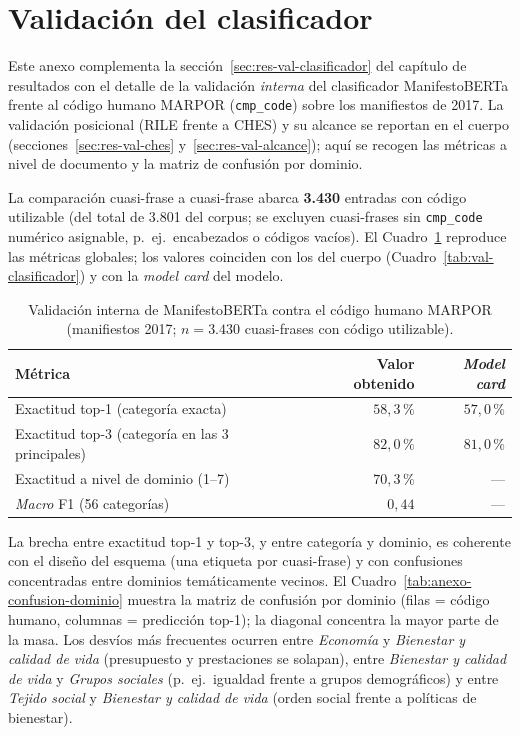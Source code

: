 \section{Validación del clasificador}
\label{anexo:validacion}

Este anexo complementa la sección~\ref{sec:res-val-clasificador} del capítulo de
resultados con el detalle de la validación \emph{interna} del clasificador
ManifestoBERTa \cite{manifestoberta2024} frente al código humano MARPOR
(\texttt{cmp\_code}) sobre los manifiestos de 2017. La validación posicional
(RILE frente a CHES) y su alcance se reportan en el cuerpo
(secciones~\ref{sec:res-val-ches} y~\ref{sec:res-val-alcance}); aquí se recogen
las métricas a nivel de documento y la matriz de confusión por dominio.

La comparación cuasi-frase a cuasi-frase abarca \textbf{3.430} entradas con
código utilizable (del total de 3.801 del corpus; se excluyen cuasi-frases sin
\texttt{cmp\_code} numérico asignable, p.\ ej.\ encabezados o códigos vacíos).
El Cuadro~\ref{tab:anexo-val-clasificador} reproduce las métricas globales; los
valores coinciden con los del cuerpo (Cuadro~\ref{tab:val-clasificador}) y con
la \emph{model card} del modelo.

\begin{table}[H]
\centering
\caption{Validación interna de ManifestoBERTa contra el código humano MARPOR
(manifiestos 2017; $n = 3.430$ cuasi-frases con código utilizable).}
\label{tab:anexo-val-clasificador}
\begin{tabular}{@{}l r r@{}}
\toprule
\textbf{Métrica} & \textbf{Valor obtenido} & \textbf{\emph{Model card}} \\
\midrule
Exactitud top-1 (categoría exacta) & $58{,}3\,\%$ & $57{,}0\,\%$ \\
Exactitud top-3 (categoría en las 3 principales) & $82{,}0\,\%$ & $81{,}0\,\%$ \\
Exactitud a nivel de dominio (1--7) & $70{,}3\,\%$ & --- \\
\emph{Macro} F1 (56 categorías) & $0{,}44$ & --- \\
\bottomrule
\end{tabular}
\end{table}

La brecha entre exactitud top-1 y top-3, y entre categoría y dominio, es coherente
con el diseño del esquema (una etiqueta por cuasi-frase) y con confusiones
concentradas entre dominios temáticamente vecinos. El
Cuadro~\ref{tab:anexo-confusion-dominio} muestra la matriz de confusión por
dominio (filas = código humano, columnas = predicción top-1); la diagonal
concentra la mayor parte de la masa. Los desvíos más frecuentes ocurren entre
\emph{Economía} y \emph{Bienestar y calidad de vida} (presupuesto y prestaciones
se solapan), entre \emph{Bienestar y calidad de vida} y \emph{Grupos sociales} (p.\ ej.\ igualdad frente
a grupos demográficos) y entre \emph{Tejido social} y \emph{Bienestar y calidad de vida}
(orden social frente a políticas de bienestar).


